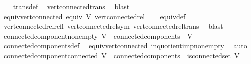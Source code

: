 \begin{isabellebody}
%
\isadelimproof
\ \ %
\endisadelimproof
%
\isatagproof
{}\isamarkupfalse%
\ trans{\isacharunderscore}{\kern0pt}def\ \isamarkupfalse%
\ vert{\isacharunderscore}{\kern0pt}connected{\isacharunderscore}{\kern0pt}trans\ \isamarkupfalse%
\ blast%
\endisatagproof
{\isafoldproof}%
%
\isadelimproof
\isanewline
%
\endisadelimproof
\isanewline
{}\isamarkupfalse%
\ equiv{\isacharunderscore}{\kern0pt}vert{\isacharunderscore}{\kern0pt}connected{\isacharcolon}{\kern0pt}\ {\isachardoublequoteopen}equiv\ V\ vert{\isacharunderscore}{\kern0pt}connected{\isacharunderscore}{\kern0pt}rel{\isachardoublequoteclose}\isanewline
%
\isadelimproof
\ \ %
\endisadelimproof
%
\isatagproof
{}\isamarkupfalse%
\ equiv{\isacharunderscore}{\kern0pt}def\ \isamarkupfalse%
\ vert{\isacharunderscore}{\kern0pt}connected{\isacharunderscore}{\kern0pt}rel{\isacharunderscore}{\kern0pt}refl\ vert{\isacharunderscore}{\kern0pt}connected{\isacharunderscore}{\kern0pt}rel{\isacharunderscore}{\kern0pt}sym\ vert{\isacharunderscore}{\kern0pt}connected{\isacharunderscore}{\kern0pt}rel{\isacharunderscore}{\kern0pt}trans\ \isamarkupfalse%
\ blast%
\endisatagproof
{\isafoldproof}%
%
\isadelimproof
\isanewline
%
\endisadelimproof
\isanewline
{}\isamarkupfalse%
\ connected{\isacharunderscore}{\kern0pt}component{\isacharunderscore}{\kern0pt}non{\isacharunderscore}{\kern0pt}empty{\isacharcolon}{\kern0pt}\ {\isachardoublequoteopen}V{\isacharprime}{\kern0pt}\ {\isasymin}\ connected{\isacharunderscore}{\kern0pt}components\ {\isasymLongrightarrow}\ V{\isacharprime}{\kern0pt}\ {\isasymnoteq}\ {\isacharbraceleft}{\kern0pt}{\isacharbraceright}{\kern0pt}{\isachardoublequoteclose}\isanewline
%
\isadelimproof
\ \ %
\endisadelimproof
%
\isatagproof
{}\isamarkupfalse%
\ connected{\isacharunderscore}{\kern0pt}components{\isacharunderscore}{\kern0pt}def\ \isamarkupfalse%
\ equiv{\isacharunderscore}{\kern0pt}vert{\isacharunderscore}{\kern0pt}connected\ in{\isacharunderscore}{\kern0pt}quotient{\isacharunderscore}{\kern0pt}imp{\isacharunderscore}{\kern0pt}non{\isacharunderscore}{\kern0pt}empty\ \isamarkupfalse%
\ auto%
\endisatagproof
{\isafoldproof}%
%
\isadelimproof
\isanewline
%
\endisadelimproof
\isanewline
{}\isamarkupfalse%
\ connected{\isacharunderscore}{\kern0pt}component{\isacharunderscore}{\kern0pt}connected{\isacharcolon}{\kern0pt}\ {\isachardoublequoteopen}V{\isacharprime}{\kern0pt}\ {\isasymin}\ connected{\isacharunderscore}{\kern0pt}components\ {\isasymLongrightarrow}\ is{\isacharunderscore}{\kern0pt}connected{\isacharunderscore}{\kern0pt}set\ V{\isacharprime}{\kern0pt}{\isachardoublequoteclose}\isanewline

\end{isabellebody}
